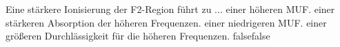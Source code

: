     {Eine stärkere Ionisierung der F2-Region führt zu ...}
    {einer höheren MUF.}
    {einer stärkeren Absorption der höheren Frequenzen.}
    {einer niedrigeren MUF.}
    {einer größeren Durchlässigkeit für die höheren Frequenzen.}
    {false}{false}